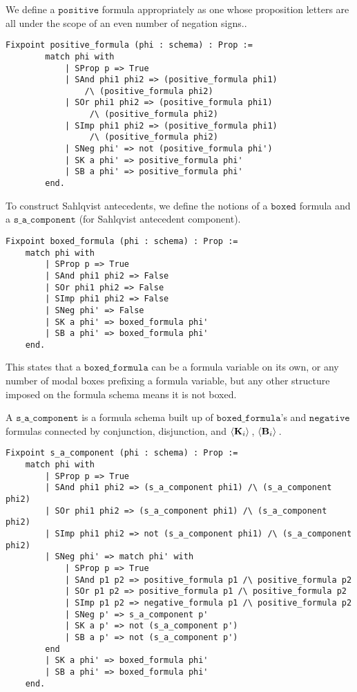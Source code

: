 We define a $\mathtt{positive}$ formula appropriately as one whose proposition letters are all under the scope of an even number of negation signs..

\begin{tcolorbox}
	\begin{lstlisting}[language=Coq]
	Fixpoint positive_formula (phi : schema) : Prop :=
		match phi with
			| SProp p => True
			| SAnd phi1 phi2 => (positive_formula phi1) 
				/\ (positive_formula phi2)
			| SOr phi1 phi2 => (positive_formula phi1)
				 /\ (positive_formula phi2)
			| SImp phi1 phi2 => (positive_formula phi1)
				 /\ (positive_formula phi2)
			| SNeg phi' => not (positive_formula phi')
			| SK a phi' => positive_formula phi'
			| SB a phi' => positive_formula phi'
		end.
	\end{lstlisting}	
	
\end{tcolorbox}

To construct Sahlqvist antecedents, we define the notions of a $\mathtt{boxed}$ formula and a $\mathtt{s\_a\_component}$ (for Sahlqvist antecedent component).

\begin{tcolorbox}
	\begin{lstlisting}[language=Coq]
Fixpoint boxed_formula (phi : schema) : Prop :=
	match phi with
		| SProp p => True
		| SAnd phi1 phi2 => False
		| SOr phi1 phi2 => False
		| SImp phi1 phi2 => False
		| SNeg phi' => False
		| SK a phi' => boxed_formula phi'
		| SB a phi' => boxed_formula phi'
	end.
	\end{lstlisting}	
	
\end{tcolorbox}

This states that a $\mathtt{boxed\_formula}$ can be a formula variable on its own, or any number of modal boxes prefixing a formula variable, but any other structure imposed on the formula schema means it is not boxed.

A $\mathtt{s\_a\_component}$ is a formula schema built up of $\mathtt{boxed\_formula}$'s and $\mathtt{negative}$ formulas connected by conjunction, disjunction, and $\langle \mathbf{K}_{i} \rangle\,$, $\langle \mathbf{B}_{i} \rangle\,$.

\begin{tcolorbox}
	\begin{lstlisting}[language=Coq]
Fixpoint s_a_component (phi : schema) : Prop :=
	match phi with
		| SProp p => True
		| SAnd phi1 phi2 => (s_a_component phi1) /\ (s_a_component phi2)
		| SOr phi1 phi2 => (s_a_component phi1) /\ (s_a_component phi2)
		| SImp phi1 phi2 => not (s_a_component phi1) /\ (s_a_component phi2)
		| SNeg phi' => match phi' with
			| SProp p => True
			| SAnd p1 p2 => positive_formula p1 /\ positive_formula p2
			| SOr p1 p2 => positive_formula p1 /\ positive_formula p2
			| SImp p1 p2 => negative_formula p1 /\ positive_formula p2
			| SNeg p' => s_a_component p'
			| SK a p' => not (s_a_component p')
			| SB a p' => not (s_a_component p')
		end
		| SK a phi' => boxed_formula phi'
		| SB a phi' => boxed_formula phi'
	end.
	\end{lstlisting}	
	
\end{tcolorbox}

